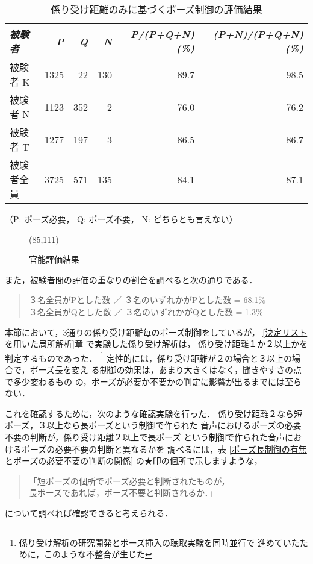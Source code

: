 \begin{table*}
\caption{係り受け距離のみに基づくポーズ制御の評価結果}
\label{係り受け距離のみに基づくポーズ制御の評価結果}
\begin{center}
\begin{tabular}{lrrrrr} \hline
	{\it 被験者} &	{\it P} & {\it Q} & {\it N} & {\it
	P/(P+Q+N) (\%)} & {\it (P+N)/(P+Q+N) (\%) } \\ \hline
   被験者 K   & 1325 &   22 &  130 &  89.7  &     98.5\\
   被験者 N   & 1123 &  352 &    2 &  76.0  & 	  76.2\\
   被験者 T   & 1277 &  197 &    3 &   86.5 & 	  86.7\\
   被験者全員 & 3725 &  571 &  135 &   84.1 & 	  87.1\\ \hline
\end{tabular}
\end{center}
\begin{center}
    （P: ポーズ必要， Q: ポーズ不要， N: どちらとも言えない）\\
\end{center}
\end{table*}

\begin{figure}[t]
  \begin{center}
	\atari(85,111)
    \vspace{-3mm}
    \caption{官能評価結果}
    \vspace{-5mm}
  \end{center}
\end{figure}


   また，被験者間の評価の重なりの割合を調べると次の通りである．
\begin{quote}
   ３名全員がPとした数  ／ ３名のいずれかがPとした数 = 68.1\%\\
   ３名全員がQとした数  ／ ３名のいずれかがQとした数 =  1.3\%
\end{quote}


   本節において，3通りの係り受け距離毎のポーズ制御をしているが，
   \ref{決定リストを用いた局所解析}章 で実験した係り受け解析は，
   係り受け距離１か２以上かを判定するものであった．
   \footnote{係り受け解析の研究開発とポーズ挿入の聴取実験を同時並行で
   進めていたために，このような不整合が生じた}
   定性的には，係り受け距離が２の場合と３以上の場合で，ポーズ長を変え
   る制御の効果は，あまり大きくはなく，聞きやすさの点で多少変わるもの
   の，ポーズが必要か不要かの判定に影響が出るまでには至らない．

   これを確認するために，次のような確認実験を行った．
   係り受け距離２なら短ポーズ，３以上なら長ポーズという制御で作られた
   音声におけるポーズの必要不要の判断が，係り受け距離２以上で長ポーズ
   という制御で作られた音声におけるポーズの必要不要の判断と異なるかを
   調べるには，表 \ref{ポーズ長制御の有無とポーズの必要不要の判断の関係}
   の★印の個所で示しますような，
\begin{quote}
  「短ポーズの個所でポーズ必要と判断されたものが，\\
    長ポーズであれば，ポーズ不要と判断されるか．」
\end{quote}
   について調べれば確認できると考えられる．
   
